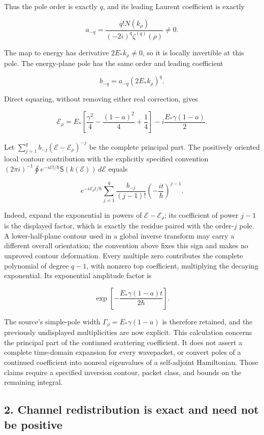 Thus the pole order is exactly \(q\), and its leading Laurent
coefficient is exactly

\[
a_{-q}=
\frac{q!N(k_\rho)}{(-2i)^q\zeta^{(q)}(\rho)}\ne0.
\]

The map to energy has derivative \(2E_*k_\rho\ne0\), so it is locally
invertible at this pole. The energy-plane pole has the same order and
leading coefficient

\[
b_{-q}=a_{-q}(2E_*k_\rho)^q.
\]

Direct squaring, without removing either real correction, gives

\[
\mathcal E_\rho
=E_*\left[\frac{\gamma^2}{4}-\frac{(1-a)^2}{4}+\frac14\right]
-i\frac{E_*\gamma(1-a)}2.
\]

Let \(\sum_{j=1}^{q}b_{-j}(\mathcal E-\mathcal E_\rho)^{-j}\) be the
complete principal part. The positively oriented local contour
contribution with the explicitly specified convention
\((2\pi i)^{-1}\oint e^{-i\mathcal Et/\hbar}\mathsf S(k(\mathcal E))\,d\mathcal E\)
equals

\[
e^{-i\mathcal E_\rho t/\hbar}
\sum_{j=1}^{q}\frac{b_{-j}}{(j-1)!}
\left(-\frac{it}{\hbar}\right)^{j-1}.
\]

Indeed, expand the exponential in powers of
\(\mathcal E-\mathcal E_\rho\); its coefficient of power \(j-1\) is the
displayed factor, which is exactly the residue paired with the
order-\(j\) pole. A lower-half-plane contour used in a global inverse
transform may carry a different overall orientation; the convention
above fixes this sign and makes no unproved contour deformation. Every
multiple zero contributes the complete polynomial of degree \(q-1\),
with nonzero top coefficient, multiplying the decaying exponential. Its
exponential amplitude factor is

\[
\exp\!\left[-\frac{E_*\gamma(1-a)t}{2\hbar}\right].
\]

The source's simple-pole width \(\Gamma_\rho=E_*\gamma(1-a)\) is
therefore retained, and the previously undisplayed multiplicities are
now explicit. This calculation concerns the principal part of the
continued scattering coefficient. It does not assert a complete
time-domain expansion for every wavepacket, or convert poles of a
continued coefficient into nonreal eigenvalues of a self-adjoint
Hamiltonian. Those claims require a specified inversion contour, packet
class, and bounds on the remaining integral.

\subsection{2. Channel redistribution is exact and need not be
positive}\label{proof10:channel-redistribution-is-exact-and-need-not-be-positive}

